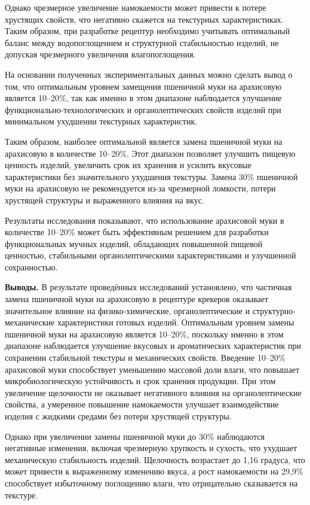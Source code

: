 {{{Однако чрезмерное увеличение намокаемости может привести к потере
хрустящих свойств, что негативно скажется на текстурных характеристиках.
Таким образом, при разработке рецептур необходимо учитывать оптимальный
баланс между водопоглощением и структурной стабильностью изделий, не
допуская чрезмерного увеличения влагопоглощения.

На основании полученных экспериментальных данных можно сделать вывод о
том, что оптимальным уровнем замещения пшеничной муки на арахисовую
является 10--20\%, так как именно в этом диапазоне наблюдается улучшение
функционально-технологических и органолептических свойств изделий при
минимальном ухудшении текстурных характеристик.

Таким образом, наиболее оптимальной является замена пшеничной муки на
арахисовую в количестве 10--20\%. Этот диапазон позволяет улучшить
пищевую ценность изделий, увеличить срок их хранения и усилить вкусовые
характеристики без значительного ухудшения текстуры. Замена 30\%
пшеничной муки на арахисовую не рекомендуется из-за чрезмерной ломкости,
потери хрустящей структуры и выраженного влияния на вкус.

Результаты исследования показывают, что использование арахисовой муки в
количестве 10--20\% может быть эффективным решением для разработки
функциональных мучных изделий, обладающих повышенной пищевой ценностью,
стабильными органолептическими характеристиками и улучшенной
сохранностью.

{\bfseries Выводы.} В результате проведённых исследований установлено, что
частичная замена пшеничной муки на арахисовую в рецептуре крекеров
оказывает значительное влияние на физико-химические, органолептические и
структурно-механические характеристики готовых изделий. Оптимальным
уровнем замены пшеничной муки на арахисовую является 10--20\%, поскольку
именно в этом диапазоне наблюдается улучшение вкусовых и ароматических
характеристик при сохранении стабильной текстуры и механических свойств.
Введение 10--20\% арахисовой муки способствует уменьшению массовой доли
влаги, что повышает микробиологическую устойчивость и срок хранения
продукции. При этом увеличение щелочности не оказывает негативного
влияния на органолептические свойства, а умеренное повышение
намокаемости улучшает взаимодействие изделия с жидкими средами без
потери хрустящей структуры.

Однако при увеличении замены пшеничной муки до 30\% наблюдаются
негативные изменения, включая чрезмерную хрупкость и сухость, что
ухудшает механическую стабильность изделий. Щелочность возрастает до
1,16 градуса, что может привести к выраженному изменению вкуса, а рост
намокаемости на 29,9\% способствует избыточному поглощению влаги, что
отрицательно сказывается на текстуре.

}}}
